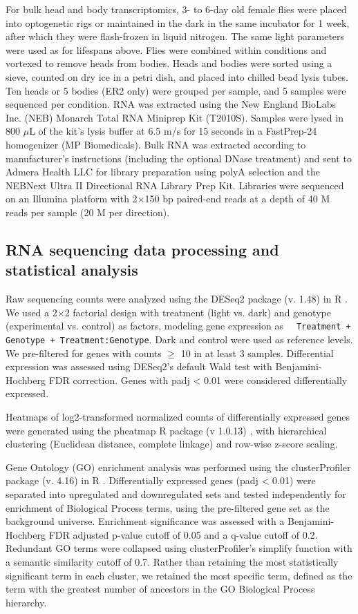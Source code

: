 For bulk head and body transcriptomics, 3- to 6-day old female flies were placed into optogenetic rigs or maintained in the dark in the same incubator for 1 week, after which they were flash-frozen in liquid nitrogen.
The same light parameters were used as for lifespans above.
Flies were combined within conditions and vortexed to remove heads from bodies.
Heads and bodies were sorted using a sieve, counted on dry ice in a petri dish, and placed into chilled bead lysis tubes.
Ten heads or 5 bodies (ER2 only) were grouped per sample, and 5 samples were sequenced per condition. 
RNA was extracted using the New England BioLabs Inc. (NEB) Monarch Total RNA Miniprep Kit (T2010S). 
Samples were lysed in 800 $\mu$L of the kit's lysis buffer at 6.5 m/s for 15 seconds in a FastPrep-24 homogenizer (MP Biomedicals).
Bulk RNA was extracted according to manufacturer's instructions (including the optional DNase treatment) and sent to Admera Health LLC for library preparation using polyA selection and the NEBNext Ultra II Directional RNA Library Prep Kit.
Libraries were sequenced on an Illumina platform with 2$\times$150 bp paired-end reads at a depth of 40 M reads per sample (20 M per direction).

\subsection*{RNA sequencing data processing and statistical analysis}

Raw sequencing counts were analyzed using the DESeq2 package (v. 1.48) in R \citep{love2014}. 
We used a 2$\times$2 factorial design with treatment (light vs. dark) and genotype (experimental vs. control) as factors, modeling gene expression as \texttt{~ Treatment + Genotype + Treatment:Genotype}.
Dark and control were used as reference levels.
We pre-filtered for genes with counts $\geq$ 10 in at least 3 samples.
Differential expression was assessed using DESeq2's default Wald test with Benjamini-Hochberg FDR correction.
Genes with padj < 0.01 were considered differentially expressed. 

Heatmaps of log2-transformed normalized counts of differentially expressed genes were generated using the pheatmap R package (v 1.0.13) \citep{pheatmap}, with hierarchical clustering (Euclidean distance, complete linkage) and row-wise z-score scaling.

Gene Ontology (GO) enrichment analysis was performed using the clusterProfiler package (v. 4.16) in R \citep{clusterprofiler}. 
Differentially expressed genes (padj < 0.01) were separated into upregulated and downregulated sets and tested independently for enrichment of Biological Process terms, using the pre-filtered gene set as the background universe. 
Enrichment significance was assessed with a Benjamini-Hochberg FDR adjusted p-value cutoff of 0.05 and a q-value cutoff of 0.2. 
Redundant GO terms were collapsed using clusterProfiler's simplify function with a semantic similarity cutoff of 0.7. 
Rather than retaining the most statistically significant term in each cluster, we retained the most specific term, defined as the term with the greatest number of ancestors in the GO Biological Process hierarchy.

